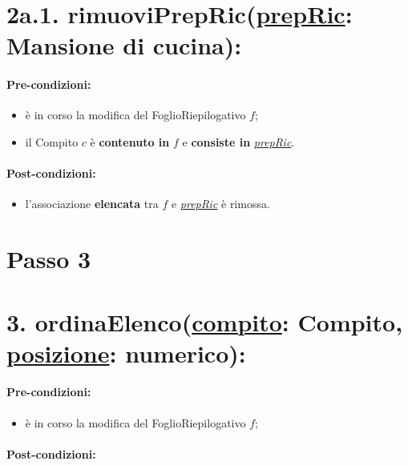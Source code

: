 \section*{2a.1. rimuoviPrepRic(\underline{prepRic}: Mansione di cucina):}

\paragraph{Pre-condizioni:}

\begin{itemize}
  \item è in corso la modifica del FoglioRiepilogativo $f$;
  \item il Compito $c$ è \textbf{contenuto in} $f$ e \textbf{consiste in} \underline{\textit{prepRic}}.    
\end{itemize}

\paragraph{Post-condizioni:}

\begin{itemize}
  \item l'associazione \textbf{elencata} tra $f$ e \underline{\textit{prepRic}} è rimossa.
\end{itemize}

\section{Passo 3}

\section*{3. ordinaElenco(\underline{compito}: Compito, \underline{posizione}: numerico):}

\paragraph{Pre-condizioni:}

\begin{itemize}
  \item è in corso la modifica del FoglioRiepilogativo $f$;
\end{itemize}

\paragraph{Post-condizioni:}

